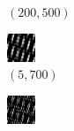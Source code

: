 \documentclass[a4paper, landscape]{article}
\begin{document}
\begin{figure}[H]
\begin{subfigure}{0.12\linewidth}
        \caption{$(200, 500)$}
    \end{subfigure}
    \begin{subfigure}{0.12\linewidth}
        \centering
        \includegraphics[width=\linewidth]{iht/k = 5, m = 700.png}
        \caption{$(5, 700)$}
    \end{subfigure}
    \begin{subfigure}{0.12\linewidth}
        \centering
        \includegraphics[width=\linewidth]{iht/k = 10, m = 700.png}

\end{subfigure}
\end{figure}
\end{document}
